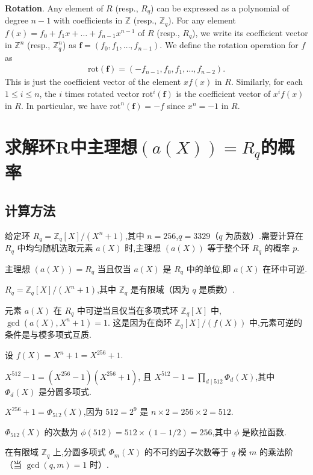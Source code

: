 \documentclass[12pt,a4paper]{article}
\numberwithin{equation}{section}
\begin{document}
\textbf{Rotation}. Any element of $R$ (resp., $R_q$) can be expressed as a polynomial of degree $n - 1$ with coefficients in $\mathbb{Z}$ (resp., $\mathbb{Z}_q$). For any element $f(x) = f_0 + f_1x + \ldots + f_{n-1}x^{n-1}$ of $R$ (resp., $R_q$), we write its coefficient vector in $\mathbb{Z}^n$ (resp., $\mathbb{Z}^n_q$) as $\mathbf{f} = (f_0, f_1, \ldots , f_{n-1})$. We define the rotation operation for $f$ as  
\begin{align*}
    \mathrm{rot}(\mathbf{f}) = (-f_{n-1}, f_0, f_1, \ldots , f_{n-2}).
\end{align*}
This is just the coefficient vector of the element $xf (x)$ in $R$. Similarly, for each $1 \leq i \leq  n$, the $i$ times rotated vector $\mathrm{rot}^i(\mathbf{f})$ is the coefficient vector of $x^if(x)$ in $R$. 
In particular, we have $\mathrm{rot}^n(\mathbf{f}) = -f$ since $x^n = -1$ in $R$.

\section[求解环R中主理想(a(X))=Rq的概率]{求解环R中主理想$(a(X))=R_q$的概率}
\subsection{计算方法}

给定环 $R_q = \mathbb{Z}_q[X]/(X^n + 1)$,其中 $n = 256$,$q = 3329$（$q$ 为质数）.需要计算在 $R_q$ 中均匀随机选取元素 $a(X)$ 时,主理想 $(a(X))$ 等于整个环 $R_q$ 的概率 $p$.

主理想 $(a(X)) = R_q$ 当且仅当 $a(X)$ 是 $R_q$ 中的单位,即 $a(X)$ 在环中可逆.

$R_q = \mathbb{Z}_q[X]/(X^n + 1)$,其中 $\mathbb{Z}_q$ 是有限域（因为 $q$ 是质数）.

元素 $a(X)$ 在 $R_q$ 中可逆当且仅当在多项式环 $\mathbb{Z}_q[X]$ 中,$\gcd(a(X), X^n + 1) = 1$.
这是因为在商环 $\mathbb{Z}_q[X]/(f(X))$ 中,元素可逆的条件是与模多项式互质.

设 $f(X) = X^n + 1 = X^{256} + 1$.

$X^{512} - 1 = (X^{256} - 1)(X^{256} + 1)$,
且 $X^{512} - 1 = \prod_{d \mid 512} \Phi_d(X)$,其中 $\Phi_d(X)$ 是分圆多项式.

$X^{256} + 1 = \Phi_{512}(X)$,因为 $512 = 2^9$ 是 $n \times 2 = 256 \times 2 = 512$.

$\Phi_{512}(X)$ 的次数为 $\phi(512) = 512 \times (1 - 1/2) = 256$,其中 $\phi$ 是欧拉函数.

在有限域 $\mathbb{Z}_q$ 上,分圆多项式 $\Phi_m(X)$ 的不可约因子次数等于 $q$ 模 $m$ 的乘法阶（当 $\gcd(q, m) = 1$ 时）.
\end{document}
